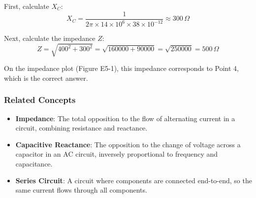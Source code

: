 First, calculate \( X_C \):
\[
X_C = \frac{1}{2\pi \times 14 \times 10^6 \times 38 \times 10^{-12}} \approx 300 \, \Omega
\]

Next, calculate the impedance \( Z \):
\[
Z = \sqrt{400^2 + 300^2} = \sqrt{160000 + 90000} = \sqrt{250000} = 500 \, \Omega
\]

On the impedance plot (Figure E5-1), this impedance corresponds to Point 4, which is the correct answer.

\subsubsection{Related Concepts}
\begin{itemize}
    \item \textbf{Impedance}: The total opposition to the flow of alternating current in a circuit, combining resistance and reactance.
    \item \textbf{Capacitive Reactance}: The opposition to the change of voltage across a capacitor in an AC circuit, inversely proportional to frequency and capacitance.
    \item \textbf{Series Circuit}: A circuit where components are connected end-to-end, so the same current flows through all components.
\end{itemize}

